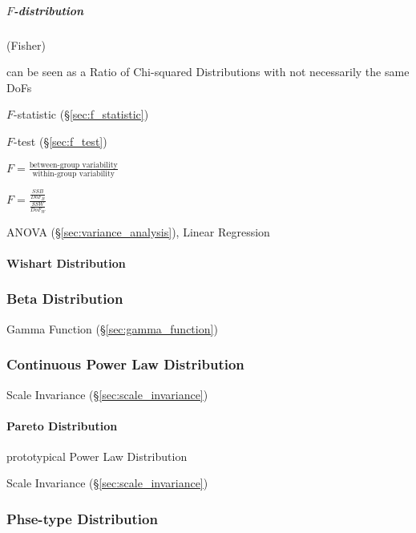 \subparagraph{$F$-distribution}\label{sec:f_distribution}\hfill

(Fisher)

can be seen as a Ratio of Chi-squared Distributions with not necessarily the
same DoFs

$F$-statistic (\S\ref{sec:f_statistic})

$F$-test (\S\ref{sec:f_test})

$F = \frac{\text{between-group variability}}{\text{within-group variability}}$

$F = \frac{\frac{SSB}{DoF_B}}{\frac{SSW}{DoF_W}}$

ANOVA (\S\ref{sec:variance_analysis}), Linear Regression



\paragraph{Wishart Distribution}\label{sec:wishart_distribution}\hfill



\subsubsection{Beta Distribution}\label{sec:beta_distribution}

Gamma Function (\S\ref{sec:gamma_function})



\subsubsection{Continuous Power Law Distribution}
\label{sec:continuous_power_law_distribution}

Scale Invariance (\S\ref{sec:scale_invariance})



\paragraph{Pareto Distribution}\label{sec:pareto_distribution}\hfill

prototypical Power Law Distribution

Scale Invariance (\S\ref{sec:scale_invariance})



\subsubsection{Phse-type Distribution}\label{sec:phasetype_distribution}

